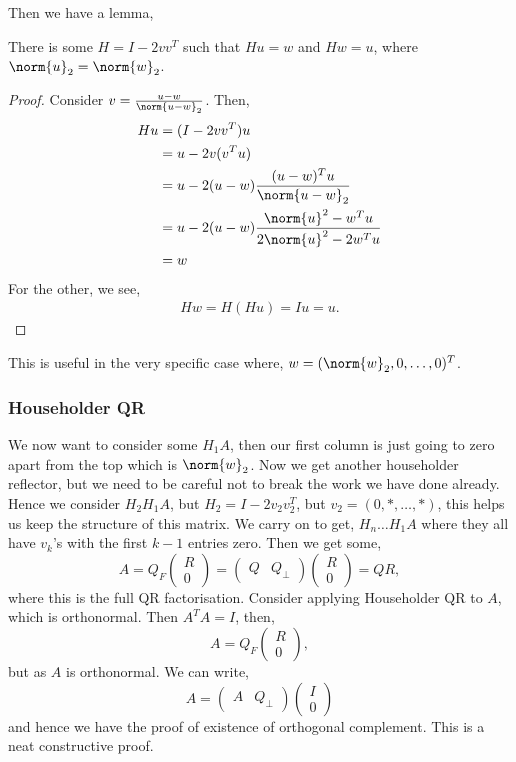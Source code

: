 Then we have a lemma,
\begin{nlemma}
  There is some $H = I - 2vv^T$ such that $Hu = w$ and $Hw = u$, where $\norm{u}_2 = \norm{w}_2$.
\end{nlemma}
\begin{proof}
  Consider $v = \frac{u - w}{\norm{u - w}_2}$. Then,
  \begin{align*}
    Hu &= (I - 2vv^T)u \\
    &= u - 2v(v^Tu) \\
    &= u - 2(u - w) \frac{(u - w)^T u}{\norm{u - w}_2} \\
    &= u - 2(u - w) \frac{\norm{u}^2 - w^Tu}{2\norm{u}^2 - 2w^Tu} \\
    &= w
  \end{align*}
  For the other, we see,
  \begin{align*}
    Hw = H(Hu) = Iu = u.
  \end{align*}
\end{proof}

\noindent
This is useful in the very specific case where, $w = (\norm{w}_2, 0, \dots, 0)^T$.

\subsubsection{Householder QR}
We now want to consider some $H_1A$, then our first column is just going to zero apart from the top which is $\norm{w}_2$. Now we get another householder reflector, but we need to be careful not to break the work we have done already. Hence we consider $H_2H_1A$, but $H_2 = I - 2v_2v_2^T$, but $v_2 = (0, *, \dots, *)$, this helps us keep the structure of this matrix. We carry on to get, $H_n\dots H_1A$ where they all have $v_k$'s with the first $k-1$ entries zero. Then we get some,
$$ A = Q_F \begin{pmatrix}
  R \\ 0
\end{pmatrix} = \begin{pmatrix}
  Q & Q_\perp
\end{pmatrix} \begin{pmatrix}
  R \\ 0
\end{pmatrix} = QR, $$
where this is the full QR factorisation. Consider applying Householder QR to $A$, which is orthonormal. Then $A^TA = I$, then,
$$ A = Q_F \begin{pmatrix}
  R \\ 0
\end{pmatrix}, $$
but as $A$ is orthonormal. We can write,
$$ A = \begin{pmatrix}
  A & Q_\perp
\end{pmatrix} \begin{pmatrix}
  I \\ 0
\end{pmatrix} $$
and hence we have the proof of existence of orthogonal complement. This is a neat constructive proof.\\

